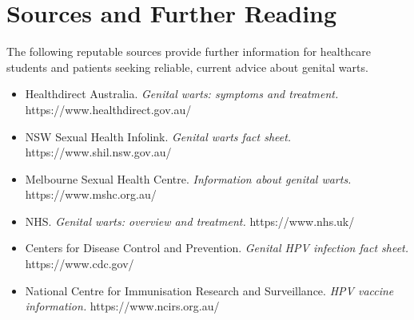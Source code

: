 \section*{Sources and Further Reading}
The following reputable sources provide further information for healthcare students and patients seeking reliable, current advice about genital warts.

\begin{itemize}
    \item Healthdirect Australia. \textit{Genital warts: symptoms and treatment.} https://www.healthdirect.gov.au/
    \item NSW Sexual Health Infolink. \textit{Genital warts fact sheet.} https://www.shil.nsw.gov.au/
    \item Melbourne Sexual Health Centre. \textit{Information about genital warts.} https://www.mshc.org.au/
    \item NHS. \textit{Genital warts: overview and treatment.} https://www.nhs.uk/
    \item Centers for Disease Control and Prevention. \textit{Genital HPV infection fact sheet.} https://www.cdc.gov/
    \item National Centre for Immunisation Research and Surveillance. \textit{HPV vaccine information.} https://www.ncirs.org.au/
\end{itemize}
